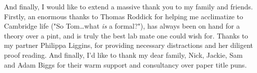 \begin{acknowledgements}
And finally, I would like to extend a massive thank you to my family and friends. Firstly, an enormous thanks to Thomas Roddick for helping me acclimatize to Cambridge life ("So Tom\dots what \emph{is} a formal?"), has always been on hand for a theory over a pint, and is truly the best lab mate one could wish for. Thanks to my partner Philippa Liggins, for providing necessary distractions and her diligent proof reading. And finally, I'd like to thank my dear family, Nick, Jackie, Sam and Adam Biggs for their warm support and consultancy over paper title puns.








\end{acknowledgements}
